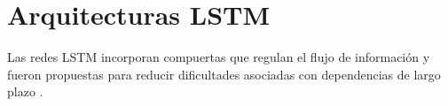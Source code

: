 \section{Arquitecturas LSTM}

Las redes LSTM incorporan compuertas que regulan el flujo de información y fueron propuestas para reducir dificultades asociadas con dependencias de largo plazo \cite{hochreiter1997lstm}.
